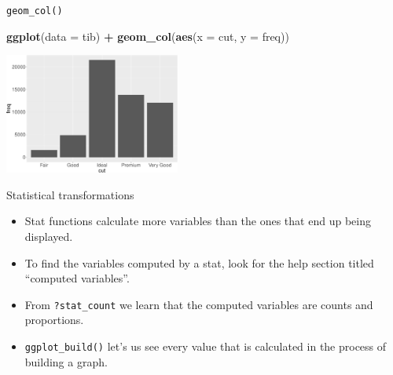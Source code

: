 \documentclass[ignorenonframetext,]{beamer}
\newenvironment{Shaded}{\begin{snugshade}}{\end{snugshade}}
\newcommand{\DataTypeTok}[1]{\textcolor[rgb]{0.13,0.29,0.53}{#1}}
\newcommand{\KeywordTok}[1]{\textcolor[rgb]{0.13,0.29,0.53}{\textbf{#1}}}
\newcommand{\NormalTok}[1]{#1}
\newcommand{\OperatorTok}[1]{\textcolor[rgb]{0.81,0.36,0.00}{\textbf{#1}}}
\newcommand{\StringTok}[1]{\textcolor[rgb]{0.31,0.60,0.02}{#1}}
\begin{document}
\begin{frame}[fragile]{\texttt{geom\_col()}}
\protect\hypertarget{geom_col-1}{}

\begin{Shaded}
\begin{Highlighting}[]
\KeywordTok{ggplot}\NormalTok{(}\DataTypeTok{data =}\NormalTok{ tib) }\OperatorTok{+}
\StringTok{  }\KeywordTok{geom_col}\NormalTok{(}\KeywordTok{aes}\NormalTok{(}\DataTypeTok{x =}\NormalTok{ cut, }\DataTypeTok{y =}\NormalTok{ freq))}
\end{Highlighting}
\end{Shaded}

\begin{center}\includegraphics[height=150px]{data-visualization_files/figure-beamer/unnamed-chunk-117-1} \end{center}

\end{frame}

\begin{frame}[fragile]{Statistical transformations}
\protect\hypertarget{statistical-transformations-7}{}

\begin{itemize}
\item
  Stat functions calculate more variables than the ones that end up
  being displayed.
\item
  To find the variables computed by a stat, look for the help section
  titled ``computed variables''.
\item
  From \texttt{?stat\_count} we learn that the computed variables are
  counts and proportions.
\item
  \texttt{ggplot\_build()} let's us see every value that is calculated
  in the process of building a graph.
\end{itemize}

\end{frame}
\end{document}
